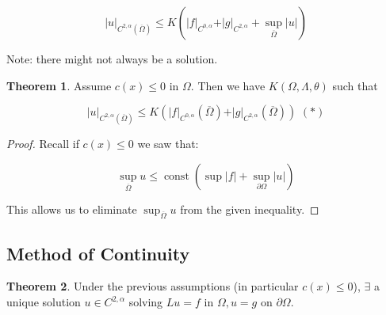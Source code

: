 \documentclass{article}
\theoremstyle{definition}
\newtheorem{theorem}{Theorem}
\begin{document}
\[
    \vert u \vert_{C^{2,\alpha}(\overline{\Omega})} \leq K \left( \vert f \vert_{C^{0,\alpha}} + \vert g \vert_{C^{2,\alpha}} + \sup_{\overline{\Omega}} \vert u \vert \right) 
\]

Note: there might not always be a solution.

\begin{theorem}
    Assume \(c(x) \leq 0\) in \(\Omega\). Then we have \(K(\Omega, \Lambda, \theta)\) such that

    \[
        \vert u \vert_{C^{2,\alpha}(\overline{\Omega})} \leq K \left( \vert f \vert_{C^{0,\alpha}}(\overline{\Omega}) + \vert g \vert_{C^{2,\alpha}}(\overline{\Omega}) \right) \,\,(\ast)
    \]
\end{theorem}

\begin{proof}
    Recall if \(c(x) \leq 0\) we saw that:

    \[
        \sup_{\overline{\Omega}} u \leq \operatorname{const} \left( \sup \vert f \vert + \sup_{\partial \Omega} \vert u \vert \right) 
    \]

    This allows us to eliminate \(\sup_{\overline{\Omega}} u\) from the given inequality. 
\end{proof}

\subsection*{Method of Continuity}

\begin{theorem}
    Under the previous assumptions (in particular \(c(x) \leq 0\)), \(\exists\) a unique solution \(u \in C^{2,\alpha}\) solving \(Lu = f\) in \(\Omega, u=g\) on \(\partial \Omega\).
\end{theorem}
\end{document}
